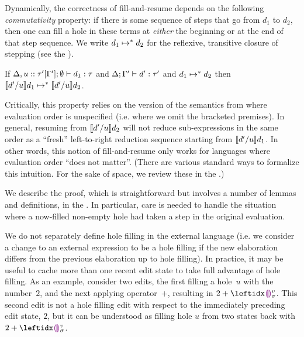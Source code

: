 Dynamically, the correctness of fill-and-resume depends on
the following \emph{commutativity} property: if there is some sequence of
steps that go from $d_1$ to $d_2$, then one can fill a hole in these
terms at \emph{either} the beginning or at the end of that step
sequence.
%
We write $d_1 \mapsto^* d_2$ for the reflexive,
transitive closure of stepping (see the \appendixName).
%
\begin{thm}[Commutativity]
  If $\Delta, u :: \tau'[\Gamma']; \emptyset \vdash d_1 : \tau$
  and $\Delta; \Gamma' \vdash d' : \tau'$ and $d_1 \mapsto^* d_2$
  then $\llbracket d' / u\rrbracket d_1 \mapsto^* \llbracket d' / u\rrbracket d_2$.
\end{thm}
%
Critically, this property relies on the version of
the semantics from  where evaluation order is
unspecified (i.e. where we omit the bracketed premises).
%
In general, resuming from $\llbracket d' / u\rrbracket d_2$ will not
reduce sub-expressions in the same order as a ``fresh'' left-to-right
reduction sequence starting from $\llbracket d' / u\rrbracket d_1$.
%
In other words, this notion of fill-and-resume only works for
languages where evaluation order ``does not matter''.
(There are various standard ways to formalize this intuition.
For the sake of space, we review these in the \appendixName.)


We describe the proof, which is straightforward but involves a
number of lemmas and definitions, in the \appendixName.
%
In particular, care is needed to handle the situation where a
now-filled non-empty hole had taken a step in the original evaluation.


We do not separately define hole filling in the external language (i.e. we
consider a change to an external expression to be a hole filling if the new
elaboration differs from the previous elaboration up to hole filling).  In
practice, it may be useful to cache more than one recent edit state to take
full advantage of hole filling.  As an example, consider two edits, the
first filling a hole~$u$ with the number~$2$, and the next applying
operator~$+$, resulting in $2 + \dehole{v}{\sigma}{}$.
%
This second edit is not a hole filling edit with respect to the
immediately preceding edit state, $2$, but it can be understood as filling
hole $u$ from two states back with $2 + \dehole{v}{\sigma}{}$.

